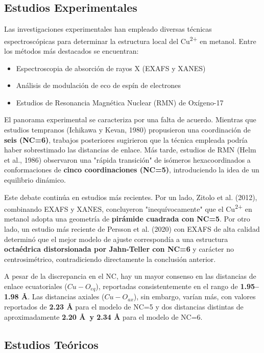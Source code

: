 \subsection*{Estudios Experimentales}

Las investigaciones experimentales han empleado diversas técnicas espectroscópicas para determinar la estructura local del Cu\textsuperscript{2+} en metanol. Entre los métodos más destacados se encuentran:
\begin{itemize}
    \item Espectroscopia de absorción de rayos X (EXAFS y XANES)
    \item Análisis de modulación de eco de espín de electrones
    \item Estudios de Resonancia Magnética Nuclear (RMN) de Oxígeno-17
\end{itemize}

El panorama experimental se caracteriza por una falta de acuerdo. Mientras que estudios tempranos (Ichikawa y Kevan, 1980) propusieron una coordinación de \textbf{seis (NC=6)}, trabajos posteriores sugirieron que la técnica empleada podría haber sobrestimado las distancias de enlace. Más tarde, estudios de RMN (Helm et al., 1986) observaron una "rápida transición" de isómeros hexacoordinados a conformaciones de \textbf{cinco coordinaciones (NC=5)}, introduciendo la idea de un equilibrio dinámico.

Este debate continúa en estudios más recientes. Por un lado, Zitolo et al. (2012), combinando EXAFS y XANES, concluyeron "inequívocamente" que el Cu\textsuperscript{2+} en metanol adopta una geometría de \textbf{pirámide cuadrada con NC=5}. Por otro lado, un estudio más reciente de Persson et al. (2020) con EXAFS de alta calidad determinó que el mejor modelo de ajuste correspondía a una estructura \textbf{octaédrica distorsionada por Jahn-Teller con NC=6} y carácter no centrosimétrico, contradiciendo directamente la conclusión anterior.

A pesar de la discrepancia en el NC, hay un mayor consenso en las distancias de enlace ecuatoriales ($Cu-O_{eq}$), reportadas consistentemente en el rango de \textbf{1.95--1.98 \AA}. Las distancias axiales ($Cu-O_{ax}$), sin embargo, varían más, con valores reportados de \textbf{2.23 \AA} para el modelo de NC=5 y dos distancias distintas de aproximadamente \textbf{2.20 \AA \ y 2.34 \AA} para el modelo de NC=6.

\subsection*{Estudios Teóricos}

